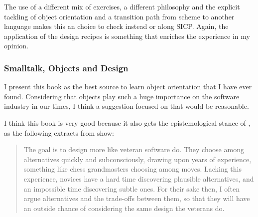 The use of a different mix of exercises, a different philosophy and the explicit
tackling of object orientation and a transition path from scheme to another
language makes this an choice to check instead or along SICP. Again, the
application of the design recipes is something that enriches the experience in
my opinion.  


\subsubsection{Smalltalk, Objects and Design}

I present this book as the best source to learn object orientation that I have
ever found. Considering that objects play such a huge importance on the software
industry in our times, I think a suggestion focused on that would be reasonable.

I think this book is very good because it also gets the epistemological stance
of \cite{education:papert_mindstorms}, as the following extracts from
\cite{programming:chamond__sod} show:

\begin{quote}
        The goal is to design more like veteran software do. They choose among
    alternatives quickly and subconsciously, drawing upon years of experience,
    something like chess grandmasters choosing among moves. Lacking this experience,
    novices have a hard time discovering plausible alternatives, and an impossible
    time discovering subtle ones. For their sake then, I often argue alternatives
    and the trade-offs between them, so that they will have an outside chance of
    considering the same design the veterans do.
\end{quote}
